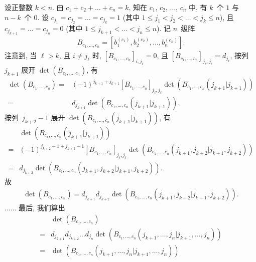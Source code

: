 \begin{example}
    设正整数 \(k < n\).
    由 \(c_1 + c_2 + \dots + c_n = k\),
    知在 \(c_1\), \(c_2\), \(\dots\), \(c_n\)
    中, 有 \(k\)~个 \(1\) 与 \(n-k\)~个 \(0\).
    设 \(c_{j_1} = c_{j_2} = \dots = c_{j_k} = 1\)
    (其中 \(1 \leq j_1 < j_2 < \dots < j_k \leq n\)),
    且 \(c_{j_{k+1}} = \dots = c_{j_n} = 0\)
    (其中 \(1 \leq j_{k+1} < \dots < j_n \leq n\)).
    记 \(n\)~级阵
    \begin{align*}
        B_{c_1,\dots,c_n}
        = [b_1^{(c_1)}, b_2^{(c_2)}, \dots, b_n^{(c_n)}].
    \end{align*}
    注意到, 当 \(\ell > k\),
    且 \(i \neq j_\ell\) 时,
    \([B_{c_1,\dots,c_n}]_{i,j_\ell} = 0\),
    且 \([B_{c_1,\dots,c_n}]_{j_\ell,j_\ell} = d_{j_\ell}\),
    按列~\(j_{k+1}\) 展开 \(\det {(B_{c_1,\dots,c_n})}\),
    有
    \begin{align*}
        \det {(B_{c_1,\dots,c_n})}
        = {} & (-1)^{j_{k+1}+j_{k+1}}
        [B_{c_1,\dots,c_n}]_{j_\ell,j_\ell}
        \det {(B_{c_1,\dots,c_n}(j_{k+1}|j_{k+1}))}
        \\
        = {} &
        d_{j_{k+1}} \det {(B_{c_1,\dots,c_n}(j_{k+1}|j_{k+1}))}.
    \end{align*}
    按列~\(j_{k+2}-1\) 展开
    \(\det {(B_{c_1,\dots,c_n}(j_{k+1}|j_{k+1}))}\),
    有
    \begin{align*}
             &
        \det {(B_{c_1,\dots,c_n}(j_{k+1}|j_{k+1}))}
        \\
        = {} & (-1)^{j_{k+2}-1+j_{k+2}-1}
        [B_{c_1,\dots,c_n}]_{j_\ell,j_\ell}
        \det {(B_{c_1,\dots,c_n}
        ({j_{k+1},j_{k+2}}|{j_{k+1},j_{k+2}}))}
        \\
        = {} &
        d_{j_{k+2}}
        \det {(B_{c_1,\dots,c_n}
        ({j_{k+1},j_{k+2}}|{j_{k+1},j_{k+2}}))}.
    \end{align*}
    故
    \begin{align*}
        \det {(B_{c_1,\dots,c_n})}
        = d_{j_{k+1}} d_{j_{k+2}}
        \det {(B_{c_1,\dots,c_n}
        ({j_{k+1},j_{k+2}}|{j_{k+1},j_{k+2}}))}.
    \end{align*}
    \(\dots \dots\)
    最后, 我们算出
    \begin{align*}
             &
        \det {(B_{c_1,\dots,c_n})}
        \\
        = {} &
        d_{j_{k+1}} d_{j_{k+2}} \dots d_{j_n}
        \det {(B_{c_1,\dots,c_n}
        ({j_{k+1},\dots,j_n}|{j_{k+1},\dots,j_n}))}
        \\
        = {} &
        \det {(B_{c_1,\dots,c_n}
        ({j_{k+1},\dots,j_n}|{j_{k+1},\dots,j_n}))}

\end{align*}
\end{example}
